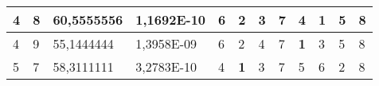 \documentclass[conference]{IEEEtran}
\begin{document}
\begin{table*}[]
\begin{tabular}{|llll|llllllll|}
\multicolumn{1}{|l|}{4}                                                     & \multicolumn{1}{l|}{8}                                                        & \multicolumn{1}{l|}{60,5555556}                                                   & 1,1692E-10                     & \multicolumn{1}{l|}{6}                                                  & \multicolumn{1}{l|}{2}                                                  & \multicolumn{1}{l|}{3}                                                  & \multicolumn{1}{l|}{7}                                                  & \multicolumn{1}{l|}{4}                                                  & \multicolumn{1}{l|}{\textbf{1}}                                         & \multicolumn{1}{l|}{5}                                                  & 8                          \\ \hline
\multicolumn{1}{|l|}{4}                                                     & \multicolumn{1}{l|}{9}                                                        & \multicolumn{1}{l|}{55,1444444}                                                   & 1,3958E-09                     & \multicolumn{1}{l|}{6}                                                  & \multicolumn{1}{l|}{2}                                                  & \multicolumn{1}{l|}{4}                                                  & \multicolumn{1}{l|}{7}                                                  & \multicolumn{1}{l|}{\textbf{1}}                                         & \multicolumn{1}{l|}{3}                                                  & \multicolumn{1}{l|}{5}                                                  & 8                          \\ \hline
\multicolumn{1}{|l|}{5}                                                     & \multicolumn{1}{l|}{7}                                                        & \multicolumn{1}{l|}{58,3111111}                                                   & 3,2783E-10                     & \multicolumn{1}{l|}{4}                                                  & \multicolumn{1}{l|}{\textbf{1}}                                         & \multicolumn{1}{l|}{3}                                                  & \multicolumn{1}{l|}{7}                                                  & \multicolumn{1}{l|}{5}                                                  & \multicolumn{1}{l|}{6}                                                  & \multicolumn{1}{l|}{2}                                                  & 8                          \\ \hline

\end{tabular}
\end{table*}
\end{document}
